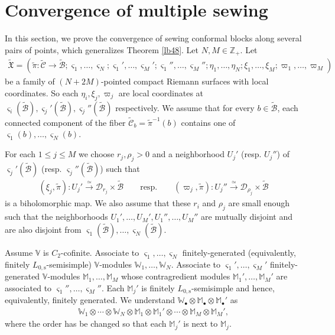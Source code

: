\documentclass[11pt,b5paper,notitlepage]{article}
\theoremstyle{definition}
\theoremstyle{plain}
\newcommand{\fk}{\mathfrak}
\newcommand{\mc}{\mathcal}
\newcommand{\wtd}{\widetilde}
\newcommand{\sgm}{\varsigma}
\newcommand{\blt}{\bullet}
\newcommand{\Vbb}{\mathbb V}
\newcommand{\Wbb}{\mathbb W}
\newcommand{\Mbb}{\mathbb M}
\newcommand{\Zbb}{\mathbb Z}
\newcommand{\Lss}{{L_{0,\mathrm{s}}}}
\numberwithin{equation}{section}
\begin{document}
\section{Convergence of multiple sewing}\label{lb56}


In this section, we prove the convergence of sewing conformal blocks along several pairs of points, which generalizes Theorem \ref{lb48}. Let $N,M\in\Zbb_+$. Let
\begin{align*}
\wtd{\fk X}=(\wtd\pi:\wtd{\mc C}\rightarrow\wtd{\mc B};\sgm_1,\dots,\sgm_N;\sgm_1',\dots,\sgm_M';\sgm_1'',\dots,\sgm_M'';\eta_1,\dots,\eta_N;\xi_1,\dots,\xi_M;\varpi_1,\dots,\varpi_M)
\end{align*}
be a family of $(N+2M)$-pointed compact Riemann surfaces with local coordinates. So each $\eta_i,\xi_j,\varpi_j$ are local coordinates at $\sgm_i(\wtd{\mc B}),\sgm_j'(\wtd{\mc B}),\sgm_j''(\wtd{\mc B})$ respectively. We assume that for every $b\in\wtd{\mc B}$, each connected component of the fiber  $\wtd{\mc C}_b=\wtd\pi^{-1}(b)$ contains one of $\sgm_1(b),\dots,\sgm_N(b)$.

For each $1\leq j\leq M$ we choose $r_j,\rho_j>0$ and a neighborhood $U_j'$ (resp. $U_j''$) of $\sgm_j'(\wtd {\mc B})$ (resp. $\sgm_j''(\wtd {\mc B})$) such that
\begin{gather}
(\xi_j,\wtd\pi):U_j'\xrightarrow{\simeq} \mc D_{r_j}\times\wtd{\mc B}\qquad\text{resp.}\qquad (\varpi_j,\wtd\pi):U_j''\xrightarrow{\simeq} \mc D_{\rho_j}\times\wtd{\mc B}\label{eq94}
\end{gather}
is a biholomorphic map. We also assume that these $r_i$ and $\rho_j$ are small enough such that the neighborhoods $U_1',\dots,U_M',U_1'',\dots,U_M''$ are mutually disjoint and are also disjoint from $\sgm_1(\wtd{\mc B}),\dots,\sgm_N(\wtd{\mc B})$. 




Assume $\Vbb$ is $C_2$-cofinite. Associate to $\sgm_1,\dots,\sgm_N$ finitely-generated (equivalently, finitely $\Lss$-semisimple) $\Vbb$-modules $\Wbb_1,\dots,\Wbb_N$. Associate to $\sgm_1',\dots,\sgm_M'$ finitely-generated  $\Vbb$-modules $\Mbb_1,\dots,\Mbb_M$ whose contragredient modules $\Mbb_1',\dots,\Mbb_M'$ are associated to $\sgm_1'',\dots,\sgm_M''$. Each $\Mbb_j'$ is finitely $\Lss$-semisimple and hence, equivalently, finitely generated.  We understand $\Wbb_\blt\otimes\Mbb_\blt\otimes\Mbb_\blt'$ as
\begin{align*}
\Wbb_1\otimes\cdots\otimes \Wbb_N\otimes\Mbb_1\otimes\Mbb_1'\otimes\cdots\otimes\Mbb_M\otimes\Mbb_M',
\end{align*}
where the order has be changed so that each $\Mbb_j'$ is next to $\Mbb_j$. 
\end{document}
